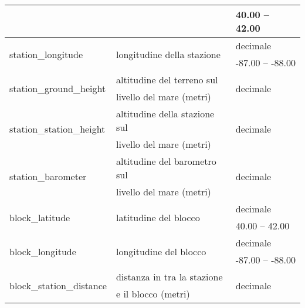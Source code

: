 \begin{longtable}{lll}
	& & {40.00} -- {42.00}  \\ \hline
	\multirow{2}{*}{station\_longitude}	& \multirow{2}{*}{longitudine della 
		stazione} 	&  decimale     \\ 
	& & {-87.00} -- {-88.00} \\ \hline 
	\multirow{2}{*}{station\_ground\_height}	& 	altitudine del terreno sul  
	& 	\multirow{2}{*}{decimale}	\\
	& livello del mare (metri) &\\ \hline		
	\multirow{2}{*}{station\_station\_height}	& 	altitudine della stazione 
	sul  &	\multirow{2}{*}{decimale} 	\\
	& livello del mare (metri) & \\ \hline
	\multirow{2}{*}{station\_barometer}			& 	altitudine del barometro 
	sul  & \multirow{2}{*}{decimale}		\\
	& livello del mare (metri) &\\ \hline	
	\multirow{2}{*}{block\_latitude}	& \multirow{2}{*}{latitudine del 
		blocco}	&  decimale    \\ 
	& & {40.00} -- {42.00}  \\ \hline
	\multirow{2}{*}{block\_longitude}	& \multirow{2}{*}{longitudine del 
		blocco} &  decimale     \\ 
	& & {-87.00} -- {-88.00} \\ \hline 
	\multirow{2}{*}{block\_station\_distance}	& distanza in tra la stazione  
	&  \multirow{2}{*}{decimale} \\ 
	& e il blocco (metri) &\\  
	\bottomrule
\end{longtable}
\label{tab:features}


